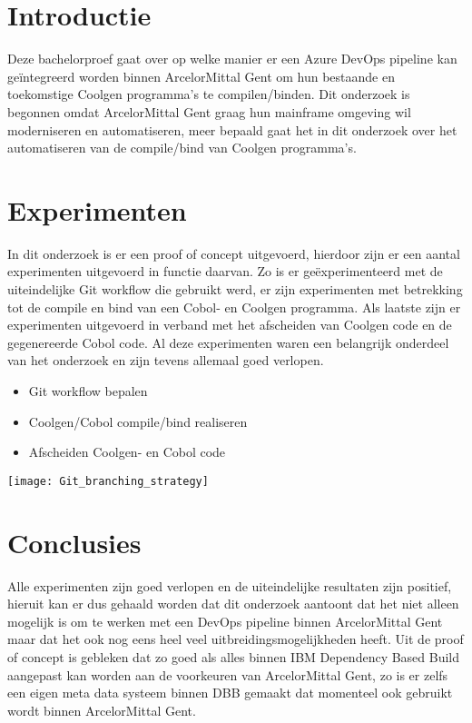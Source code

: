 \documentclass[a0,portrait]{hogent-poster}
\begin{document}
\begin{multicols}{2} %

\section{Introductie}

Deze bachelorproef gaat over op welke manier er een Azure DevOps pipeline kan geïntegreerd worden binnen ArcelorMittal Gent om hun bestaande en toekomstige Coolgen programma's te compilen/binden. 
Dit onderzoek is begonnen omdat ArcelorMittal Gent graag hun mainframe omgeving wil moderniseren en automatiseren, meer bepaald gaat het in dit onderzoek over het automatiseren van de compile/bind van Coolgen programma's.

\section{Experimenten}

In dit onderzoek is er een proof of concept uitgevoerd, hierdoor zijn er een aantal experimenten uitgevoerd in functie daarvan. Zo is er geëxperimenteerd met de uiteindelijke Git workflow die gebruikt werd, er zijn experimenten met betrekking tot de compile en bind van een Cobol- en Coolgen programma. Als laatste zijn er experimenten uitgevoerd in verband met het afscheiden van Coolgen code en de gegenereerde Cobol code. Al deze experimenten waren een belangrijk onderdeel van het onderzoek en zijn tevens allemaal goed verlopen. 
\begin{itemize}
    \item Git workflow bepalen
    \item Coolgen/Cobol compile/bind realiseren
    \item Afscheiden Coolgen- en Cobol code
\end{itemize}
\begin{center}
    \captionsetup{type=figure}
    \texttt{[image: Git\_branching\_strategy]}
    \label{fig:git workflow}
\end{center}


\section{Conclusies}

Alle experimenten zijn goed verlopen en de uiteindelijke resultaten zijn positief, hieruit kan er dus gehaald worden dat dit onderzoek aantoont dat het niet alleen mogelijk is om te werken met een DevOps pipeline binnen ArcelorMittal Gent maar dat het ook nog eens heel veel uitbreidingsmogelijkheden heeft. Uit de proof of concept is gebleken dat zo goed als alles binnen IBM Dependency Based Build aangepast kan worden aan de voorkeuren van ArcelorMittal Gent, zo is er zelfs een eigen meta data systeem binnen DBB gemaakt dat momenteel ook gebruikt wordt binnen ArcelorMittal Gent. 


\end{multicols}
\end{document}
